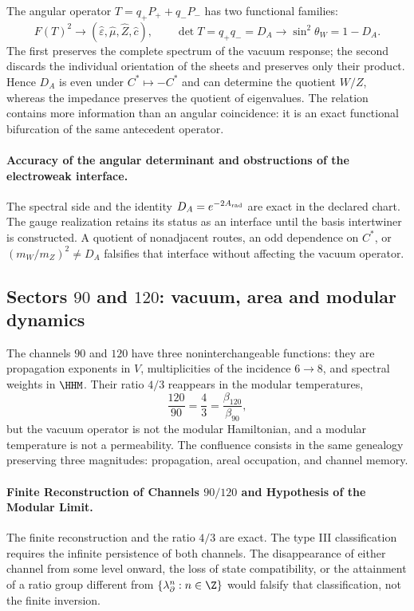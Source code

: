 The angular operator \(T=q_+P_++q_-P_-\) has two functional families:
\begin{equation}
F(T)^2\longrightarrow
(\widehat\varepsilon,\widehat\mu,\widehat Z,\widehat c),
\qquad
\det T=q_+q_-=D_A\longrightarrow
\sin^2\theta_W=1-D_A.
\label{eq:atlas-DA-confluence}
\end{equation}
The first preserves the complete spectrum of the vacuum response; the second discards the individual orientation of the sheets and preserves only their product. Hence \(D_A\) is even under \(C^*\mapsto-C^*\) and can determine the quotient \(W/Z\), whereas the impedance preserves the quotient of eigenvalues. The relation contains more information than an angular coincidence: it is an exact functional bifurcation of the same antecedent operator.

\paragraph{Accuracy of the angular determinant and obstructions of the electroweak interface.}
The spectral side and the identity \(D_A=e^{-2A_{\rm rad}}\) are exact in the
declared chart. The gauge realization retains its status as an interface until
the basis intertwiner is constructed. A quotient of nonadjacent routes, an
odd dependence on \(C^*\), or \((m_W/m_Z)^2\ne D_A\) falsifies that interface without
affecting the vacuum operator.

\subsection{Sectors \(90\) and \(120\): vacuum, area and modular dynamics}

The channels \(90\) and \(120\) have three noninterchangeable functions:
they are propagation exponents in \(V\), multiplicities of the incidence
\(6\to8\), and spectral weights in \(\HHM\). Their ratio \(4/3\) reappears in
the modular temperatures,
\[
\frac{120}{90}=\frac43=\frac{\beta_{120}}{\beta_{90}},
\]
but the vacuum operator is not the modular Hamiltonian, and a modular
temperature is not a permeability. The confluence consists in the same
genealogy preserving three magnitudes: propagation, areal occupation, and
channel memory.

\paragraph{Finite Reconstruction of Channels \(90/120\) and Hypothesis of the Modular Limit.}
The finite reconstruction and the ratio \(4/3\) are exact. The type III classification requires the infinite persistence of both channels. The disappearance of either channel from some level onward, the loss of state compatibility, or the attainment of a ratio group different from \(\{\lambda_\partial^n:n\in\Z\}\) would falsify that classification, not the finite inversion.

